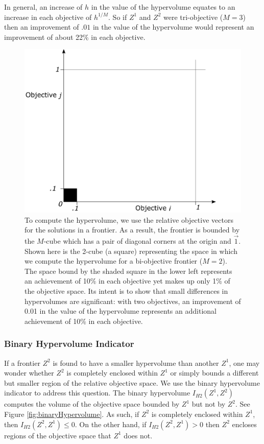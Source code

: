 In general, an increase of $h$ in the value of the hypervolume equates to an increase in each objective of $h^{1/M}$. So if $Z^1$ and $Z^2$ were tri-objective ($M=3$) then an improvement of $.01$ in the value of the hypervolume would represent an improvement of about 22\% in each objective.

\begin{figure}
\centering
\includegraphics[width=.5\textwidth]{../images/HypervolumeImprovements}
\caption[Interpreting differences in hypervolumes]{To compute the hypervolume, we use the relative objective vectors for the solutions in a frontier. As a result, the frontier is bounded by the $M$-cube which has a pair of diagonal corners at the origin and $\vec{1}$. Shown here is the 2-cube (a square) representing the space in which we compute the hypervolume for a bi-objective frontier ($M=2$). The space bound by the shaded square in the lower left represents an achievement of 10\% in each objective yet makes up only 1\% of the objective space. Its intent is to show that small differences in hypervolumes are significant: with two objectives, an improvement of 0.01 in the value of the hypervolume represents an additional achievement of 10\% in each objective.}
\label{fig:Hypervol10percent}
\end{figure}

\subsubsection{Binary Hypervolume Indicator}
If a frontier $Z^2$ is found to have a smaller hypervolume than another $Z^1$, one may wonder whether $Z^2$ is completely enclosed within $Z^1$ or simply bounds a different but smaller region of the relative objective space. We use the binary hypervolume indicator to address this question. The binary hypervolume $I_{H2}(Z^1,Z^2)$ computes the volume of the objective space bounded by $Z^1$ but not by $Z^2$. See Figure \ref{fig:binaryHypervolume}. As such, if $Z^2$ is completely enclosed within $Z^1$, then $I_{H2}(Z^2,Z^1) \le 0$. On the other hand, if $I_{H2}(Z^2,Z^1) > 0$ then $Z^2$ encloses regions of the objective space that $Z^1$ does not.

